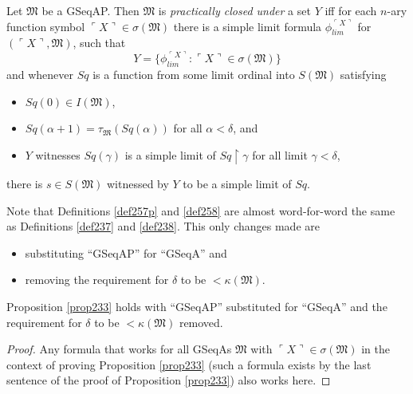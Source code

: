 \documentclass[12pt]{article}
\numberwithin{equation}{section}
\begin{document}
\begin{defi}\label{def258}
Let $\mathfrak{M}$ be a GSeqAP. Then $\mathfrak{M}$ is \emph{practically closed under} a set $Y$ iff for each $n$-ary function symbol $\ulcorner X \urcorner \in \sigma(\mathfrak{M})$ there is a simple limit formula $\phi_{lim}^{\ulcorner X \urcorner}$ for $(\ulcorner X \urcorner, \mathfrak{M})$, such that 
\begin{equation*}
    Y = \{\phi_{lim}^{\ulcorner X \urcorner} : \ulcorner X \urcorner \in \sigma(\mathfrak{M})\}
\end{equation*}
and whenever $Sq$ is a function from some limit ordinal into $S(\mathfrak{M})$ satisfying
\begin{itemize}
    \item $Sq(0) \in I(\mathfrak{M})$,
    \item $Sq(\alpha + 1) = \tau_{\mathfrak{M}}(Sq(\alpha))$ for all $\alpha < \delta$, and
    \item $Y$ witnesses $Sq(\gamma)$ is a simple limit of $Sq \restriction \gamma$ for all limit $\gamma < \delta$,
\end{itemize}
there is $s \in S(\mathfrak{M})$ witnessed by $Y$ to be a simple limit of $Sq$.
\end{defi}

Note that Definitions \ref{def257p} and \ref{def258} are almost word-for-word the same as Definitions \ref{def237} and \ref{def238}. This only changes made are \begin{itemize}
    \item substituting ``GSeqAP'' for ``GSeqA'' and 
    \item removing the requirement for $\delta$ to be $< \kappa(\mathfrak{M})$.
\end{itemize} 

\begin{prop}\label{prop261c}
Proposition \ref{prop233} holds with ``GSeqAP'' substituted for ``GSeqA'' and the requirement for $\delta$ to be $< \kappa(\mathfrak{M})$ removed.
\end{prop}

\begin{proof}
Any formula that works for all GSeqAs $\mathfrak{M}$ with $\ulcorner X \urcorner \in \sigma(\mathfrak{M})$ in the context of proving Proposition \ref{prop233} (such a formula exists by the last sentence of the proof of Proposition \ref{prop233}) also works here.
\end{proof}
\end{document}
